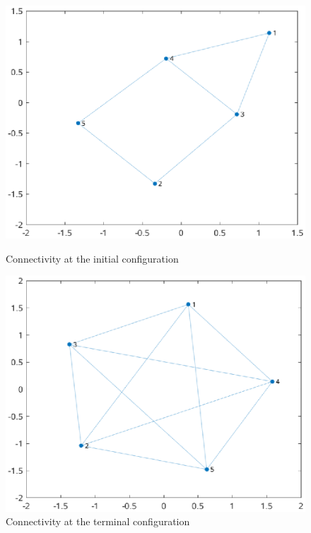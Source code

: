 \documentclass[a4paper,10pt, english]{article}
\begin{document}
\begin{figure}[ht]
  \begin{minipage}[b]{0.5\textwidth}
    \includegraphics[width=\textwidth]{figures/a5D_L+V_fine_mesh_NICE_cg0.eps}
    \caption{Connectivity at the initial configuration}
    \label{g0}
  \end{minipage}
  \hfill
  \begin{minipage}[b]{0.5\textwidth}
    \includegraphics[width=\textwidth]{figures/a5D_L+V_fine_mesh_NICE_cgT.eps}
    \caption{Connectivity at the terminal configuration}
    \label{gT}
  \end{minipage}
\end{figure}
  
\end{document}
